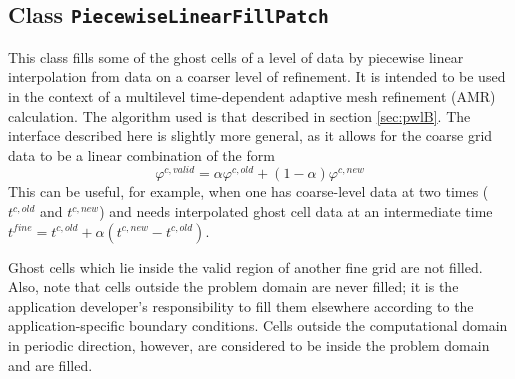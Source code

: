% 
% 
% 
% 
% 
\subsection{Class {\tt PiecewiseLinearFillPatch}}

This class fills some of the ghost cells of a level of data by
piecewise linear interpolation from data on a coarser level of
refinement.  It is intended to be used in the context of a multilevel
time-dependent adaptive mesh refinement (AMR) calculation.
The algorithm used is that described in section \ref{sec:pwlB}. The interface
described here is slightly more general, as it allows for the coarse
grid data to be a linear combination of the form 
\begin{equation*}
\varphi^{c,valid} = \alpha \varphi^{c,old} + (1 - \alpha)
\varphi^{c,new}
\end{equation*}
This can be useful, for example, when one has coarse-level data at two
times ($t^{c,old}$ and $t^{c,new}$) and needs interpolated ghost cell
data at an intermediate time $t^{fine} = t^{c,old} + \alpha(t^{c,new}
- t^{c,old})$.

Ghost cells which lie inside the valid region of another fine grid are
not filled. 
Also, note that cells outside the problem domain are never filled; it is the 
application developer's responsibility to fill them elsewhere
according to the application-specific boundary conditions. Cells
outside the computational domain in periodic direction,  however, are
considered to be inside the problem domain and are filled. 

